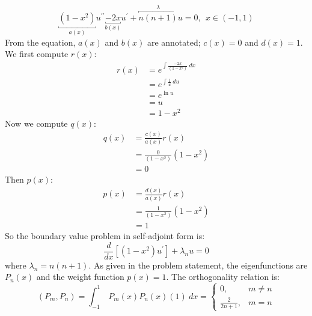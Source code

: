 \begin{equation*}
\underbracket{\left(1-x^2\right)}_{a(x)}u^{\prime \prime} \underbracket{- 2x}_{b(x)}u^{\prime}+\overbracket{n(n+1)}^{\lambda}u = 0, \ \ x\in(-1,1)
\end{equation*}
From the equation, $a(x)$ and $b(x)$ are annotated; $c(x) = 0$ and $d(x) = 1$.  We first compute $r(x)$:
\begin{align*}
r(x) &= e^{\int \frac{-2x}{\left(1-x^2\right)} \ dx} \\
&= e^{\int \frac{1}{u} \ du }\\
&= e^{\ln{u}} \\
&= u \\
&= 1-x^2
\end{align*}
Now we compute $q(x):$
\begin{align*}
q(x) &= \frac{c(x)}{a(x)}r(x) \\
&= \frac{0}{\left(1-x^2\right)}\left(1-x^2\right) \\
&= 0
\end{align*}
Then $p(x)$:
\begin{align*}
p(x) &= \frac{d(x)}{a(x)} r(x) \\
&= \frac{1}{\left(1-x^2\right)}\left(1-x^2\right) \\
&= 1
\end{align*}
So the boundary value problem in self-adjoint form is:
\begin{equation}
\frac{d}{dx}\left[\left(1-x^2\right)u^{\prime} \right]+\lambda_n u = 0
\end{equation}
where $\lambda_n = n(n+1)$.
As given in the problem statement, the eigenfunctions are $P_n(x)$ and the weight function $p(x) = 1$.  The orthogonality relation is:
\begin{equation*}
\left(P_m,P_n\right) = \int_{-1}^{1} \ P_m(x) P_n(x) (1) \ dx = 
\begin{cases}
0, & m \ne n \\
\frac{2}{2n+1}, & m = n
\end{cases}
\end{equation*}

